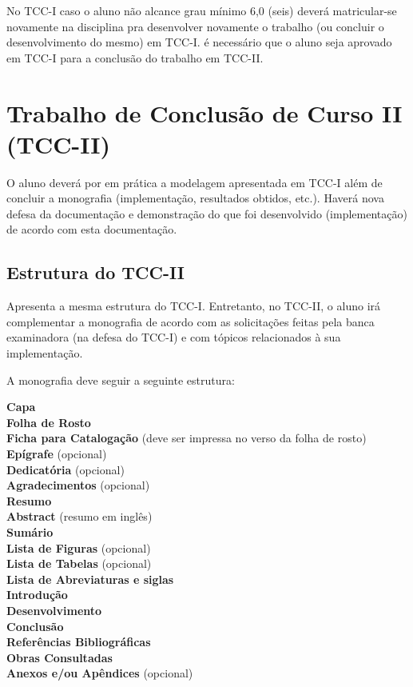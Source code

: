 No TCC-I caso o aluno n\~{a}o alcance grau m\'{i}nimo 6,0 (seis) dever\'{a} matricular-se novamente na disciplina pra desenvolver novamente o trabalho (ou concluir o desenvolvimento do mesmo)  em TCC-I.
\'{e} necess\'{a}rio que o aluno seja aprovado em TCC-I para a conclus\~{a}o do trabalho em TCC-II. 


\section{Trabalho de Conclus\~{a}o de Curso II (TCC-II)}

O aluno dever\'{a} por em pr\'{a}tica a modelagem apresentada em TCC-I al\'{e}m de concluir a monografia (implementa\c{c}\~{a}o, resultados obtidos, etc.). Haver\'{a} nova defesa da documenta\c{c}\~{a}o e demonstra\c{c}\~{a}o do que foi desenvolvido (implementa\c{c}\~{a}o) de acordo com esta documenta\c{c}\~{a}o.


\subsection{Estrutura do TCC-II}

Apresenta a mesma estrutura do TCC-I. Entretanto, no TCC-II, o aluno ir\'{a} complementar a monografia de acordo com as solicita\c{c}\~{o}es feitas pela banca examinadora (na defesa do TCC-I) e com t\'{o}picos relacionados \`{a} sua implementa\c{c}\~{a}o. 

A monografia deve seguir a seguinte estrutura: 

	\indent \textbf{Capa} \\
	\indent \textbf{Folha de Rosto} \\
	\indent \textbf{Ficha para Cataloga\c{c}\~{a}o} (deve ser impressa no verso da folha de rosto) \\
	\indent \textbf{Ep\'{i}grafe} (opcional) \\
	\indent \textbf{Dedicat\'{o}ria} (opcional) \\
	\indent \textbf{Agradecimentos} (opcional) \\
	\indent \textbf{Resumo} \\
	\indent \textbf{Abstract} (resumo em ingl\^{e}s) \\
	\indent \textbf{Sum\'{a}rio} \\
	\indent \textbf{Lista de Figuras} (opcional) \\
	\indent \textbf{Lista de Tabelas} (opcional) \\
	\indent \textbf{Lista de Abreviaturas e siglas} \\
	\indent \textbf{Introdu\c{c}\~{a}o} \\
	\indent \textbf{Desenvolvimento} \\
	\indent \textbf{Conclus\~{a}o} \\
	\indent \textbf{Refer\^{e}ncias Bibliogr\'{a}ficas} \\
	\indent \textbf{Obras Consultadas} \\
	\indent \textbf{Anexos e/ou Ap\^{e}ndices} (opcional) \\\\


